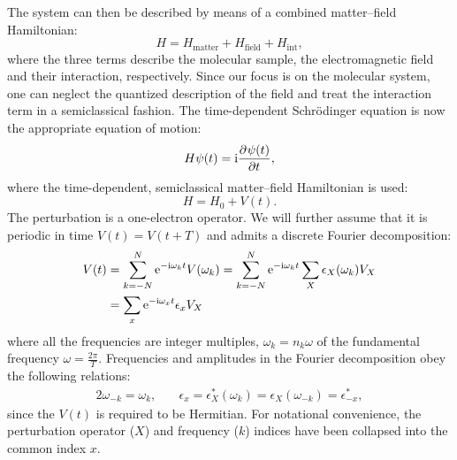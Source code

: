 The system can then be described by means of a combined matter--field
Hamiltonian:
\begin{equation}
  H = H_\mathrm{matter} + H_\mathrm{field} + H_\mathrm{int},
\end{equation}
where the three terms describe the molecular sample, the electromagnetic
field and their interaction, respectively.
Since our focus is on the molecular system, one can neglect the
quantized description of the field and treat the interaction term in a
semiclassical fashion.\autocite{Craig2012-zp}
The time-dependent Schr\"{o}dinger equation is now the appropriate
equation of motion:
\begin{equation}\label{eq:td-schrodinger}
  H\psi(t) = \mathrm{i}\frac{\partial^{}\psi(t)} {\partial t^{}},
\end{equation}
where the time-dependent, semiclassical matter--field Hamiltonian is
used:
\begin{equation}
  H = H_0 + V(t).
\end{equation}
The perturbation is a one-electron operator. We will further assume that
it is periodic in time $V(t) = V(t+T)$ and admits a discrete Fourier
decomposition:
\begin{equation}\label{eq:fourier}
  \begin{aligned}
 V(t) &=
 \sum_{k=-N}^N \mathrm{e}^{-\mathrm{i}\omega_k t}V(\omega_k)
 =
 \sum_{k=-N}^N\mathrm{e}^{-\mathrm{i}\omega_k t} \sum_X \epsilon_X(\omega_k)V_X \\
 &=
 \sum_{x}\mathrm{e}^{-\mathrm{i}\omega_x t}\epsilon_x V_X
  \end{aligned}
\end{equation}
where all the frequencies are integer multiples, $\omega_k=n_k \omega$
of the fundamental frequency $\omega = \frac{2\pi}{T}$.\autocite{Olsen1985-nr}
Frequencies and amplitudes in the Fourier decomposition obey the
following relations:
\begin{alignat}{2}
 \omega_{-k} = \omega_{k},
 \quad&
 \epsilon_x = \epsilon_X^*(\omega_k)
 =
 \epsilon_X(\omega_{-k}) = \epsilon^*_{-x},
\end{alignat}
since the $V(t)$ is required to be Hermitian.
For notational convenience, the perturbation operator ($X$) and
frequency ($k$) indices have been collapsed into the common index $x$.

